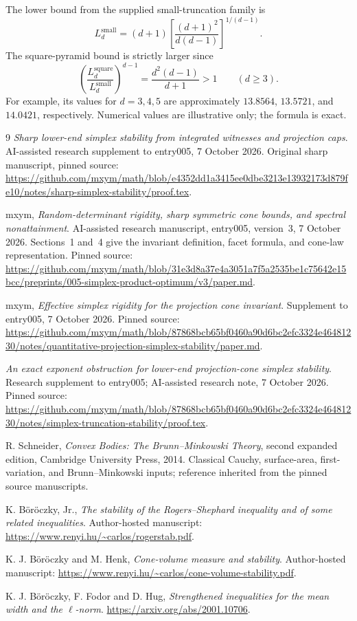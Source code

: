 \documentclass[11pt,letterpaper]{article}
\begin{document}
The lower bound from the supplied small-truncation family is
\[
 L_d^{\mathrm{small}}=(d+1)
 \left[\frac{(d+1)^2}{d(d-1)}\right]^{1/(d-1)}.
\]
The square-pyramid bound is strictly larger since
\[
 \left(\frac{L_d^{\mathrm{square}}}{L_d^{\mathrm{small}}}\right)^{d-1}
 =\frac{d^2(d-1)}{d+1}>1\qquad(d\ge3).
\]
For example, its values for $d=3,4,5$ are approximately $13.8564$,
$13.5721$, and $14.0421$, respectively. Numerical values are illustrative
only; the formula is exact.

\begin{thebibliography}{9}
\emph{Sharp lower-end simplex stability from integrated witnesses and
projection caps}. AI-assisted research supplement to entry005,
7 October 2026. Original sharp manuscript, pinned source:
\url{https://github.com/mxym/math/blob/e4352dd1a3415ee0dbe3213e13932173d879fe10/notes/sharp-simplex-stability/proof.tex}.

mxym, \emph{Random-determinant rigidity, sharp symmetric cone bounds, and
spectral nonattainment}. AI-assisted research manuscript, entry005,
version~3, 7 October 2026. Sections~1 and~4 give the invariant definition,
facet formula, and cone-law representation. Pinned source:
\url{https://github.com/mxym/math/blob/31e3d8a37e4a3051a7f5a2535be1c75642e15bcc/preprints/005-simplex-product-optimum/v3/paper.md}.

mxym, \emph{Effective simplex rigidity for the projection cone invariant}.
Supplement to entry005, 7 October 2026. Pinned source:
\url{https://github.com/mxym/math/blob/87868bcb65bf0460a90d6bc2efc3324e46481230/notes/quantitative-projection-simplex-stability/paper.md}.

\emph{An exact exponent obstruction for lower-end projection-cone simplex
stability}. Research supplement to entry005; AI-assisted research note,
7 October 2026. Pinned source:
\url{https://github.com/mxym/math/blob/87868bcb65bf0460a90d6bc2efc3324e46481230/notes/simplex-truncation-stability/proof.tex}.

R. Schneider, \emph{Convex Bodies: The Brunn--Minkowski Theory}, second
expanded edition, Cambridge University Press, 2014. Classical Cauchy,
surface-area, first-variation, and Brunn--Minkowski inputs; reference
inherited from the pinned source manuscripts.

K. B\"or\"oczky, Jr., \emph{The stability of the Rogers--Shephard inequality
and of some related inequalities}. Author-hosted manuscript:
\url{https://www.renyi.hu/~carlos/rogerstab.pdf}.

K. J. B\"or\"oczky and M. Henk, \emph{Cone-volume measure and stability}.
Author-hosted manuscript:
\url{https://www.renyi.hu/~carlos/cone-volume-stability.pdf}.

K. J. B\"or\"oczky, F. Fodor and D. Hug, \emph{Strengthened inequalities
for the mean width and the $\ell$-norm}.
\url{https://arxiv.org/abs/2001.10706}.
\end{thebibliography}
\end{document}
